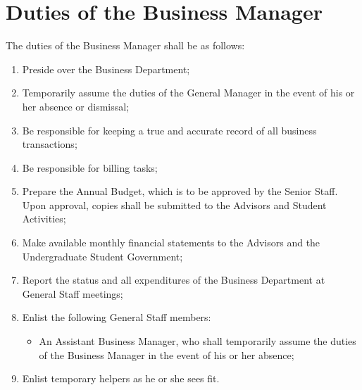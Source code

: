 \documentclass[12pt]{constitution}
\begin{document}
\section{​Duties of the Business Manager}
The duties of the Business Manager shall be as follows:
\begin{enumerate}
\item Preside over the Business Department;
\item Temporarily assume the duties of the General Manager in the event of his or her absence or dismissal;
\item Be responsible for keeping a true and accurate record of all business transactions;
\item Be responsible for billing tasks;
\item Prepare the Annual Budget, which is to be approved by the Senior Staff. Upon approval, copies shall be submitted to the Advisors and Student Activities;
\item Make available monthly financial statements to the Advisors and the Undergraduate Student Government;
\item Report the status and all expenditures of the Business Department at General Staff meetings;
\item Enlist the following General Staff members:
\begin{itemize}
\item An Assistant Business Manager, who shall temporarily assume the duties of the Business Manager in the event of his or her absence;
\end{itemize}
\item Enlist temporary helpers as he or she sees fit.
\end{enumerate}
\end{document}
